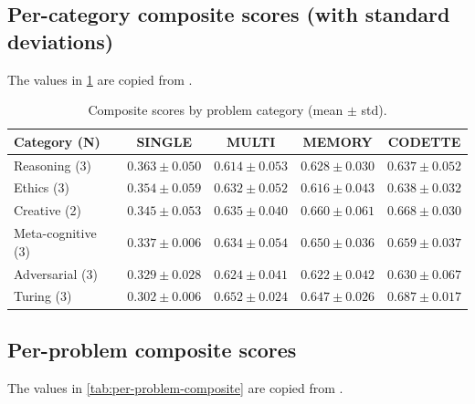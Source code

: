 \documentclass[11pt,a4paper]{article}
\begin{document}
\subsection{Per-category composite scores (with standard deviations)}
\label{app:category-results}

The values in \cref{tab:category-results-std} are copied from .

\begin{table}[ht]
\centering
\caption{Composite scores by problem category (mean $\pm$ std).}
\label{tab:category-results-std}
\begin{tabular}{lcccc}
\toprule
\textbf{Category (N)} & \textbf{SINGLE} & \textbf{MULTI} & \textbf{MEMORY} & \textbf{CODETTE} \\
\midrule
Reasoning (3)      & $0.363\pm0.050$ & $0.614\pm0.053$ & $0.628\pm0.030$ & $0.637\pm0.052$ \\
Ethics (3)         & $0.354\pm0.059$ & $0.632\pm0.052$ & $0.616\pm0.043$ & $0.638\pm0.032$ \\
Creative (2)       & $0.345\pm0.053$ & $0.635\pm0.040$ & $0.660\pm0.061$ & $0.668\pm0.030$ \\
Meta-cognitive (3) & $0.337\pm0.006$ & $0.634\pm0.054$ & $0.650\pm0.036$ & $0.659\pm0.037$ \\
Adversarial (3)    & $0.329\pm0.028$ & $0.624\pm0.041$ & $0.622\pm0.042$ & $0.630\pm0.067$ \\
Turing (3)         & $0.302\pm0.006$ & $0.652\pm0.024$ & $0.647\pm0.026$ & $0.687\pm0.017$ \\
\bottomrule
\end{tabular}
\end{table}

\subsection{Per-problem composite scores}
\label{app:per-problem}

The values in \cref{tab:per-problem-composite} are copied from .
\end{document}
